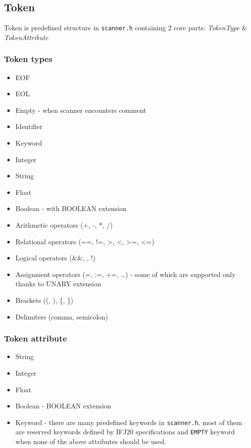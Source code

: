 \documentclass[11pt, titlepage]{article}
\begin{document}
\subsection{Token}\label{token}

Token is predefined structure in \texttt{scanner.h} containing 2 core
parts: \emph{TokenType} \& \emph{TokenAttribute}

\subsubsection{Token types}\label{token-types}

\begin{itemize}[itemsep=-5pt]
\item
  EOF
\item
  EOL
\item
  Empty - when scanner encounters comment
\item
  Identifier
\item
  Keyword
\item
  Integer
\item
  String
\item
  Float
\item
  Boolean - with BOOLEAN extension
\item
  Arithmetic operators (+, -, *, /)
\item
  Relational operators (==, !=, \textgreater, \textless, \textgreater=,
  \textless=)
\item
  Logical operators (\&\&, \textbar\textbar, !)
\item
  Assignment operators (=, :=, +=, \ldots) - some of which are supported
  only thanks to UNARY extension
\item
  Brackets ((, ), \{, \})
\item
  Delimiters (comma, semicolon)
\end{itemize}

\subsubsection{Token attribute}\label{token-attribute}

\begin{itemize}[itemsep=-5pt]
\item
  String
\item
  Integer
\item
  Float
\item
  Boolean - BOOLEAN extension
\item
  Keyword - there are many predefined keywords in \texttt{scanner.h},
  most of them are reserved keywords defined by IFJ20 specifications and
  \texttt{EMPTY} keyword when none of the above attributes should be
  used.
\end{itemize}
\end{document}

